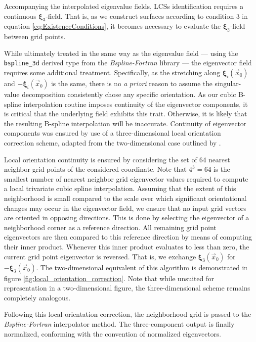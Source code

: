 Accompanying the interpolated eigenvalue fields, LCSs identification requires a continuous $\bm{\xi}_3$-field. That is, as we construct surfaces according to condition $3$ in equation \eqref{eq:ExistenceConditions}, it becomes necessary to evaluate the $\bm{\xi}_3$-field between grid points.

While ultimately treated in the same way as the eigenvalue field --- using the \texttt{bspline\_}\texttt{3d} derived type from the \textit{Bspline-Fortran} library --- the eigenvector field requires some additional treatment. Specifically, as the stretching along $\bm{\xi}_i(\vec{x}_0)$ and $-\bm{\xi}_i(\vec{x}_0)$ is the same, there is no \textit{a} \textit{priori} reason to assume the singular-value decomposition consistently chose any specific orientation. As our cubic B-spline interpolation routine imposes continuity of the eigenvector components, it is critical that the underlying field exhibits this trait. Otherwise, it is likely that the resulting B-spline interpolation will be inaccurate. Continuity of eigenvector components was ensured by use of a three-dimensional local orientation correction scheme, adapted from the two-dimensional case outlined by \cite{LCStool}.

Local orientation continuity is ensured by considering the set of $64$ nearest neighbor grid points of the considered coordinate. Note that $4^3=64$ is the smallest number of nearest neighbor grid eigenvector values required to compute a local trivariate cubic spline interpolation. Assuming that the extent of this neighborhood is small compared to the scale over which significant orientational changes may occur in the eigenvector field, we ensure that no input grid vectors are oriented in opposing directions. This is done by selecting the eigenvector of a neighborhood corner as a reference direction. All remaining grid point eigenvectors are then compared to this reference direction by means of computing their inner product. Whenever this inner product evaluates to less than zero, the current grid point eigenvector is reversed. That is, we exchange $\bm{\xi}_3(\vec{x}_0)$ for $-\bm{\xi}_3(\vec{x}_0)$. The two-dimensional equivalent of this algorithm is demonstrated in figure \ref{fig:local_orientation_correction}. Note that while unsuited for representation in a two-dimensional figure, the three-dimensional scheme remains completely analogous. 

Following this local orientation correction, the neighborhood grid is passed to the \textit{Bspline-Fortran} interpolator method. The three-component output is finally normalized, conforming with the convention of normalized eigenvectors. 

